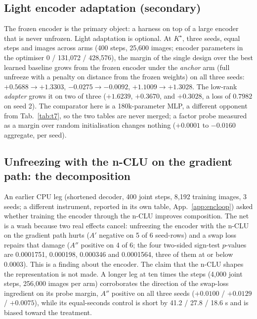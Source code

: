 \documentclass{article} %
\newcommand{\Kstar}{\ensuremath{K^{\star}}}
\begin{document}
\subsection*{Light encoder adaptation (secondary)}

The frozen encoder is the primary object: a harness on top of a large encoder that is never
unfrozen. Light adaptation is optional. At $\Kstar$, three seeds,
equal steps and images across arms (400 steps, 25,600 images; encoder parameters in the
optimiser 0 / 131,072 / 428,576), the margin of the single design over the best learned
baseline grows from the frozen encoder under the \emph{anchor} arm (full unfreeze with a
penalty on distance from the frozen weights) on all three seeds: $+0.5688\to+1.3303$,
$-0.0275\to-0.0092$, $+1.1009\to+1.3028$. The low-rank \emph{adapter} grows it on two of
three ($+1.6239$, $+0.3670$, and $+0.3028$, a loss of $0.7982$ on seed 2).
The comparator here is a 180k-parameter MLP, a different opponent from Tab.~\ref{tab:t7}, so
the two tables are never merged; a factor probe measured as a margin over random
initialisation changes nothing ($+0.0001$ to $-0.0160$ aggregate, per seed).

\subsection*{Unfreezing with the n-CLU on the gradient path: the decomposition}

An earlier CPU leg (shortened decoder, 400 joint steps, 8,192 training images, 3 seeds; a
different instrument, reported in its own table, App.~\ref{app:encloop}) asked whether
training the encoder through the n-CLU improves composition. The net is a wash because two
real effects cancel: unfreezing the encoder with the n-CLU on the gradient path hurts ($A'$
negative on 5 of 6 seed-rows) and a swap loss repairs that damage ($A''$ positive on 4 of 6;
the four two-sided sign-test $p$-values are 0.0001751, 0.000198, 0.000346 and 0.0001564, three
of them at or below 0.0003). This is a finding about the encoder. The claim
that the n-CLU shapes the representation is not made. %
A longer leg at ten times the steps (4,000 joint steps, 256,000 images per arm) corroborates
the direction of the swap-loss ingredient on its probe margin, $A''$ positive on all three
seeds ($+0.0100$ / $+0.0129$ / $+0.0075$), while its equal-seconds control is short by 41.2 /
27.8 / 18.6 s and is biased toward the treatment. %
\end{document}
